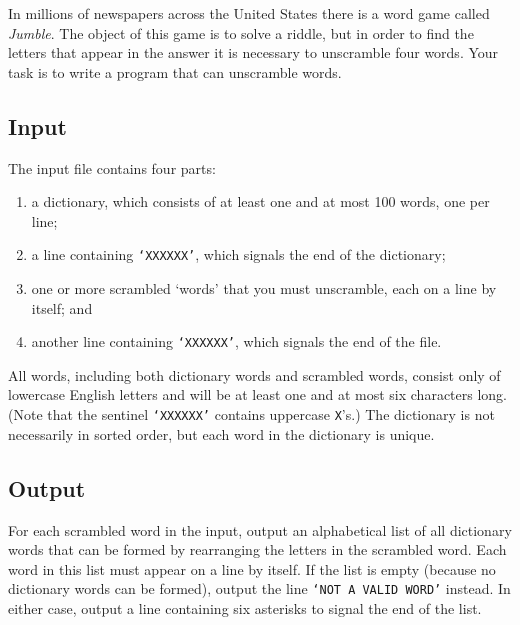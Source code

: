 In millions of newspapers across the United States there is a word game called \textit{Jumble}. The object of this game is to solve a riddle, but in order to find the letters that appear in the answer it is necessary to unscramble four words. Your task is to write a program that can unscramble words.



\subsection* {Input}

The input file contains four parts:

\begin{enumerate}
	\item a dictionary, which consists of at least one and at most 100 words, one per line;
	\item a line containing \texttt{‘XXXXXX’}, which signals the end of the dictionary;
	\item one or more scrambled ‘words’ that you must unscramble, each on a line by itself; and
	\item another line containing \texttt{‘XXXXXX’}, which signals the end of the file.

\end{enumerate}
All words, including both dictionary words and scrambled words, consist only of lowercase English letters and will be at least one and at most six characters long. (Note that the sentinel \texttt{‘XXXXXX’} contains uppercase \texttt{X}’s.) The dictionary is not necessarily in sorted order, but each word in the dictionary is unique.


\subsection* {Output}

For each scrambled word in the input, output an alphabetical list of all dictionary words that can be formed by rearranging the letters in the scrambled word. Each word in this list must appear on a line by itself. If the list is empty (because no dictionary words can be formed), output the line \texttt{‘NOT A VALID WORD’} instead. In either case, output a line containing six asterisks to signal the end of the list.

\outputnotice

\vspace{12pt}

